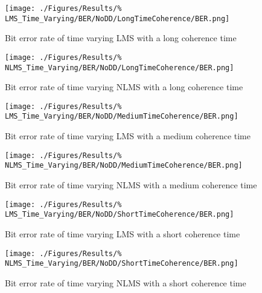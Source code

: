 \begin{figure}[ht]
	\centering
	\begin{minipage}{0.49\textwidth}
		\centering
		\texttt{[image: ./Figures/Results/\%
	LMS\_Time\_Varying/BER/NoDD/LongTimeCoherence/BER.png]}
		\captionsetup{width=0.75\linewidth}
		\caption{Bit error rate of time varying LMS with a 
		long coherence time}
	\end{minipage}
	\begin{minipage}{0.49\textwidth}
		\centering
		\texttt{[image: ./Figures/Results/\%
	NLMS\_Time\_Varying/BER/NoDD/LongTimeCoherence/BER.png]}
		\captionsetup{width=0.75\linewidth}
		\caption{Bit error rate of time varying NLMS with a 
		long coherence time}
	\label{fig:NLMS-BER-Long-None}
	\end{minipage}
\end{figure}

\begin{figure}[ht]
	\centering
	\begin{minipage}{0.49\textwidth}
		\centering
		\texttt{[image: ./Figures/Results/\%
	LMS\_Time\_Varying/BER/NoDD/MediumTimeCoherence/BER.png]}
		\captionsetup{width=0.75\linewidth}
		\caption{Bit error rate of time varying LMS with a 
		medium coherence time}
	\end{minipage}
	\begin{minipage}{0.49\textwidth}
		\centering
		\texttt{[image: ./Figures/Results/\%
	NLMS\_Time\_Varying/BER/NoDD/MediumTimeCoherence/BER.png]}
		\captionsetup{width=0.75\linewidth}
		\caption{Bit error rate of time varying NLMS with a 
		medium coherence time}
	\label{fig:NLMS-BER-Medium-None}
	\end{minipage}
\end{figure}

\begin{figure}[ht]
	\centering
	\begin{minipage}{0.49\textwidth}
		\centering
		\texttt{[image: ./Figures/Results/\%
	LMS\_Time\_Varying/BER/NoDD/ShortTimeCoherence/BER.png]}
		\captionsetup{width=0.75\linewidth}
		\caption{Bit error rate of time varying LMS with a 
		short coherence time}
	\end{minipage}
	\begin{minipage}{0.49\textwidth}
		\centering
		\texttt{[image: ./Figures/Results/\%
	NLMS\_Time\_Varying/BER/NoDD/ShortTimeCoherence/BER.png]}
		\captionsetup{width=0.75\linewidth}
		\caption{Bit error rate of time varying NLMS with a 
		short coherence time}
	\label{fig:NLMS-BER-Short-None}
	\end{minipage}
\end{figure}

